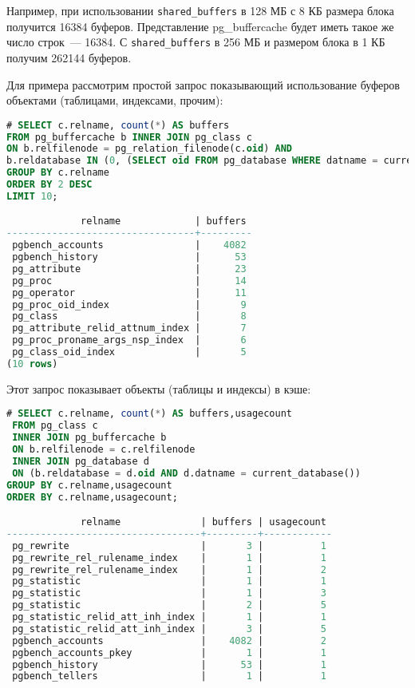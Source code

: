 Например, при использовании \lstinline!shared_buffers! в 128 МБ с 8 КБ размера блока получится 16384 буферов. Представление pg\_buffercache будет иметь такое же число строк~--- 16384. С \lstinline!shared_buffers! в 256 МБ и размером блока в 1 КБ получим 262144 буферов.

Для примера рассмотрим простой запрос показывающий использование буферов объектами (таблицами, индексами, прочим):

\begin{lstlisting}[language=SQL,label=lst:pgbuffercache2,caption=pg\_buffercache]
# SELECT c.relname, count(*) AS buffers
FROM pg_buffercache b INNER JOIN pg_class c
ON b.relfilenode = pg_relation_filenode(c.oid) AND
b.reldatabase IN (0, (SELECT oid FROM pg_database WHERE datname = current_database()))
GROUP BY c.relname
ORDER BY 2 DESC
LIMIT 10;

             relname             | buffers
---------------------------------+---------
 pgbench_accounts                |    4082
 pgbench_history                 |      53
 pg_attribute                    |      23
 pg_proc                         |      14
 pg_operator                     |      11
 pg_proc_oid_index               |       9
 pg_class                        |       8
 pg_attribute_relid_attnum_index |       7
 pg_proc_proname_args_nsp_index  |       6
 pg_class_oid_index              |       5
(10 rows)
\end{lstlisting}

Этот запрос показывает объекты (таблицы и индексы) в кэше:

\begin{lstlisting}[language=SQL,label=lst:pgbuffercache3,caption=pg\_buffercache]
# SELECT c.relname, count(*) AS buffers,usagecount
 FROM pg_class c
 INNER JOIN pg_buffercache b
 ON b.relfilenode = c.relfilenode
 INNER JOIN pg_database d
 ON (b.reldatabase = d.oid AND d.datname = current_database())
GROUP BY c.relname,usagecount
ORDER BY c.relname,usagecount;

             relname              | buffers | usagecount
----------------------------------+---------+------------
 pg_rewrite                       |       3 |          1
 pg_rewrite_rel_rulename_index    |       1 |          1
 pg_rewrite_rel_rulename_index    |       1 |          2
 pg_statistic                     |       1 |          1
 pg_statistic                     |       1 |          3
 pg_statistic                     |       2 |          5
 pg_statistic_relid_att_inh_index |       1 |          1
 pg_statistic_relid_att_inh_index |       3 |          5
 pgbench_accounts                 |    4082 |          2
 pgbench_accounts_pkey            |       1 |          1
 pgbench_history                  |      53 |          1
 pgbench_tellers                  |       1 |          1
\end{lstlisting}

